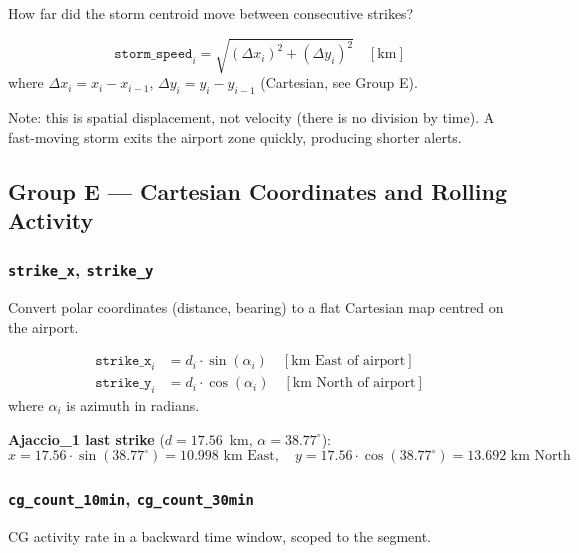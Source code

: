 \documentclass[12pt,a4paper]{article}
\newcommand{\feat}[1]{\texttt{\textbf{#1}}}
\begin{document}
How far did the storm centroid move between consecutive strikes?

\begin{formulabox}
\[
  \texttt{storm\_speed}_i = \sqrt{(\Delta x_i)^2 + (\Delta y_i)^2}
  \quad [\text{km}]
\]
where $\Delta x_i = x_i - x_{i-1}$, $\Delta y_i = y_i - y_{i-1}$ (Cartesian, see Group E).
\end{formulabox}

Note: this is spatial displacement, not velocity (there is no division by time). A fast-moving storm exits the airport zone quickly, producing shorter alerts.

\vspace{1em}

\subsection{Group E --- Cartesian Coordinates and Rolling Activity}

\subsubsection*{\feat{strike\_x}, \feat{strike\_y}}

Convert polar coordinates (distance, bearing) to a flat Cartesian map centred on the airport.

\begin{formulabox}
\begin{align}
  \texttt{strike\_x}_i &= d_i \cdot \sin(\alpha_i) \quad [\text{km East of airport}] \\
  \texttt{strike\_y}_i &= d_i \cdot \cos(\alpha_i) \quad [\text{km North of airport}]
\end{align}
where $\alpha_i$ is azimuth in radians.
\end{formulabox}

\textbf{Ajaccio\_1 last strike} ($d = 17.56$~km, $\alpha = 38.77^\circ$):
\[
  x = 17.56 \cdot \sin(38.77^\circ) = 10.998 \text{ km East},
  \quad
  y = 17.56 \cdot \cos(38.77^\circ) = 13.692 \text{ km North}
\]

\subsubsection*{\feat{cg\_count\_10min}, \feat{cg\_count\_30min}}

CG activity rate in a backward time window, scoped to the segment.
\end{document}
